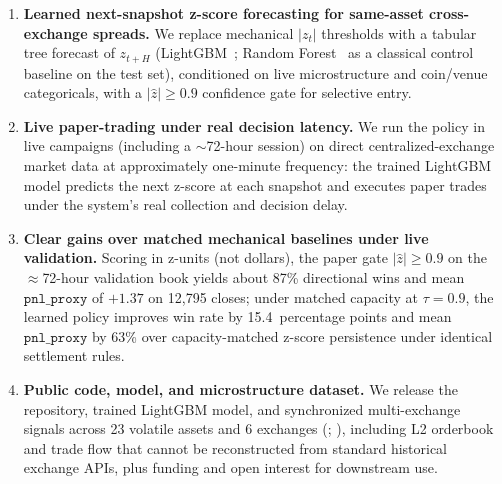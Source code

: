 \begin{enumerate}
    \item \textbf{Learned next-snapshot z-score forecasting for same-asset cross-exchange spreads.} We replace mechanical $|z_t|$ thresholds with a tabular tree forecast of $z_{t+H}$ (LightGBM~\cite{ke2017lightgbm}; Random Forest~\cite{breiman2001random} as a classical control baseline on the test set), conditioned on live microstructure and coin/venue categoricals, with a $|\hat{z}|\geq 0.9$ confidence gate for selective entry.

    \item \textbf{Live paper-trading under real decision latency.} We run the policy in live campaigns (including a $\sim$72-hour session) on direct centralized-exchange market data at approximately one-minute frequency: the trained LightGBM model predicts the next z-score at each snapshot and executes paper trades under the system's real collection and decision delay.

    \item \textbf{Clear gains over matched mechanical baselines under live validation.} Scoring in z-units (not dollars), the paper gate $|\hat{z}|\geq 0.9$ on the ${\approx}$72-hour validation book yields about 87\% directional wins and mean $\texttt{pnl\_proxy}$ of $+1.37$ on 12{,}795 closes; under matched capacity at $\tau{=}0.9$, the learned policy improves win rate by 15.4~percentage points and mean $\texttt{pnl\_proxy}$ by 63\% over capacity-matched z-score persistence under identical settlement rules.

    \item \textbf{Public code, model, and microstructure dataset.} We release the repository, trained LightGBM model, and synchronized multi-exchange signals across 23 volatile assets and 6 exchanges (\coderef; \datasetref), including L2 orderbook and trade flow that cannot be reconstructed from standard historical exchange APIs, plus funding and open interest for downstream use.
\end{enumerate}

